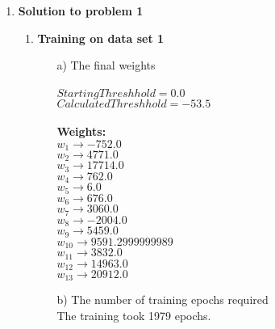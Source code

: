 \begin{enumerate}

	\item {\bf Solution to problem 1}
	
		\begin{enumerate}
			\item{\bf Training on data set 1}
				\begin{enumerate}
					\item[a)] The final weights \\ \\
						\(Starting Threshhold = 0.0\) \\
						\(Calculated Threshhold = -53.5\) \\ \\
						\bf Weights: \\
						\( w_{1} \rightarrow -752.0 \) \\
						\( w_{2} \rightarrow 4771.0 \) \\
						\( w_{3} \rightarrow 17714.0 \) \\
						\( w_{4} \rightarrow 762.0 \) \\
						\( w_{5} \rightarrow 6.0 \) \\
						\( w_{6} \rightarrow 676.0 \) \\
						\( w_{7} \rightarrow 3060.0 \) \\
						\( w_{8} \rightarrow -2004.0 \) \\
						\( w_{9} \rightarrow 5459.0 \) \\
						\( w_{10} \rightarrow 9591.2999999989 \) \\
						\( w_{11} \rightarrow 3832.0 \) \\
						\( w_{12} \rightarrow 14963.0 \) \\
						\( w_{13} \rightarrow 20912.0 \) \\
						
					\item[b)] The number of training epochs required \\
						\textnormal{The training took 1979 epochs.} \\
					

\end{enumerate}
\end{enumerate}
\end{enumerate}

